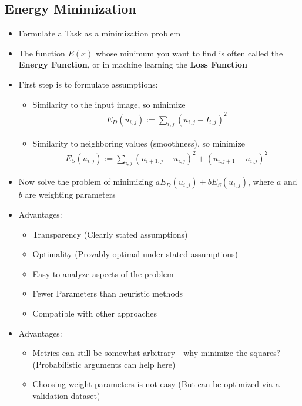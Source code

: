 \documentclass{scrartcl}
\begin{document}
\subsection*{Energy Minimization}
\begin{itemize}
    \item Formulate a Task as a minimization problem
    \item The function $E(x)$ whose minimum you want to find is often called the \textbf{Energy Function}, or in machine learning the \textbf{Loss Function}
    \item First step is to formulate assumptions:
    \begin{itemize}
        \item Similarity to the input image, so minimize
            \begin{align*}
                E_D(u_{i,j}) := \sum_{i,j} (u_{i,j} - I_{i,j})^2
            \end{align*}
        \item Similarity to neighboring values (smoothness), so minimize
            \begin{align*}
                E_S(u_{i,j}) := \sum_{i,j} (u_{i+1,j} - u_{i,j})^2 + (u_{i,j+1} - u_{i,j})^2
            \end{align*}
    \end{itemize}
    \item Now solve the problem of minimizing $aE_D(u_{i,j}) + bE_S(u_{i,j})$, where $a$ and $b$ are weighting parameters
    \item Advantages:
    \begin{itemize}
        \item Transparency (Clearly stated assumptions)
        \item Optimality (Provably optimal under stated assumptions)
        \item Easy to analyze aspects of the problem
        \item Fewer Parameters than heuristic methods
        \item Compatible with other approaches
    \end{itemize}
    \item Advantages:
    \begin{itemize}
        \item Metrics can still be somewhat arbitrary - why minimize the squares? (Probabilistic arguments can help here)
        \item Choosing weight parameters is not easy (But can be optimized via a validation dataset)

\end{itemize}
\end{itemize}
\end{document}
